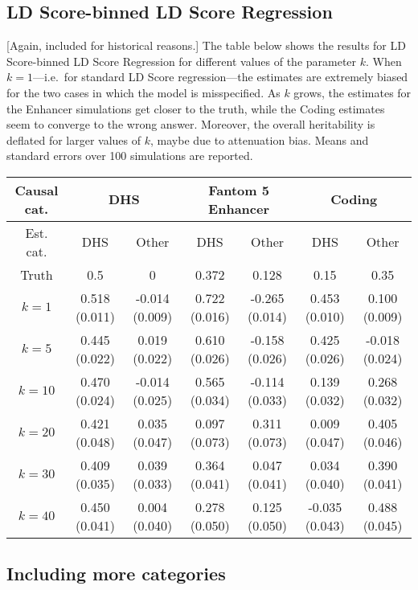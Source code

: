 \documentclass[11pt]{article}
\begin{document}
\subsection{LD Score-binned LD Score Regression}
[Again, included for historical reasons.] The table below shows the results for LD Score-binned LD Score Regression for different values of the parameter $k$. When $k = 1$---i.e.\ for standard LD Score regression---the estimates are extremely biased for the two cases in which the model is misspecified. As $k$ grows, the estimates for the Enhancer simulations get closer to the truth, while the Coding estimates seem to converge to the wrong answer. Moreover, the overall heritability is deflated for larger values of $k$, maybe due to attenuation bias. Means and standard errors over 100 simulations are reported.

\begin{center}
\begin{tabular}{c|cc|cc|cc}
Causal cat. & \multicolumn{2}{c|}{DHS} & \multicolumn{2}{c|}{Fantom 5 Enhancer} & \multicolumn{2}{c}{Coding} \\
\hline
Est. cat. & DHS & Other & DHS & Other & DHS & Other\\
\hline
Truth & 0.5 & 0 & 0.372 & 0.128 & 0.15 & 0.35\\
$k=1$ & 0.518 (0.011) & -0.014 (0.009) &0.722 (0.016) & -0.265 (0.014) &0.453 (0.010) & 0.100 (0.009) \\
\hline
$k=5$   & 0.445 (0.022) & 0.019 (0.022) & 0.610 (0.026) & -0.158 (0.026) & 0.425 (0.026) & -0.018 (0.024)\\
$k=10$ & 0.470 (0.024) & -0.014 (0.025) & 0.565 (0.034) & -0.114 (0.033) & 0.139 (0.032) & 0.268 (0.032)\\
$k=20$ & 0.421 (0.048) & 0.035 (0.047) & 0.097 (0.073) & 0.311 (0.073) & 0.009 (0.047) & 0.405 (0.046)\\
$k=30$ & 0.409 (0.035) & 0.039 (0.033) &0.364 (0.041) & 0.047 (0.041) & 0.034 (0.040) & 0.390 (0.041)\\
$k=40$ & 0.450 (0.041) & 0.004 (0.040) & 0.278 (0.050) &0.125 (0.050) &-0.035 (0.043) & 0.488 (0.045)\\
\end{tabular}
\label{2dldbinning}
\end{center}

\subsection{Including more categories}
\end{document}
